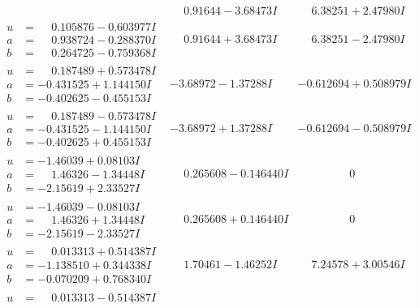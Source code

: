 \documentclass[1p]{elsarticle_modified}
\theoremstyle{definition}
\begin{document}
$$\begin{array}{c|c|c}
 & \phantom{-}0.91644 - 3.68473 I & \phantom{-}6.38251 + 2.47980 I \\ \hline\begin{aligned}
u &= \phantom{-}0.105876 - 0.603977 I \\
a &= \phantom{-}0.938724 - 0.288370 I \\
b &= \phantom{-}0.264725 - 0.759368 I\end{aligned}
 & \phantom{-}0.91644 + 3.68473 I & \phantom{-}6.38251 - 2.47980 I \\ \hline\begin{aligned}
u &= \phantom{-}0.187489 + 0.573478 I \\
a &= -0.431525 + 1.144150 I \\
b &= -0.402625 - 0.455153 I\end{aligned}
 & -3.68972 - 1.37288 I & -0.612694 + 0.508979 I \\ \hline\begin{aligned}
u &= \phantom{-}0.187489 - 0.573478 I \\
a &= -0.431525 - 1.144150 I \\
b &= -0.402625 + 0.455153 I\end{aligned}
 & -3.68972 + 1.37288 I & -0.612694 - 0.508979 I \\ \hline\begin{aligned}
u &= -1.46039 + 0.08103 I \\
a &= \phantom{-}1.46326 - 1.34448 I \\
b &= -2.15619 + 2.33527 I\end{aligned}
 & \phantom{-}0.265608 - 0.146440 I & \phantom{-0.000000 } 0 \\ \hline\begin{aligned}
u &= -1.46039 - 0.08103 I \\
a &= \phantom{-}1.46326 + 1.34448 I \\
b &= -2.15619 - 2.33527 I\end{aligned}
 & \phantom{-}0.265608 + 0.146440 I & \phantom{-0.000000 } 0 \\ \hline\begin{aligned}
u &= \phantom{-}0.013313 + 0.514387 I \\
a &= -1.138510 + 0.344338 I \\
b &= -0.070209 + 0.768340 I\end{aligned}
 & \phantom{-}1.70461 - 1.46252 I & \phantom{-}7.24578 + 3.00546 I \\ \hline\begin{aligned}
u &= \phantom{-}0.013313 - 0.514387 I \\

\end{aligned}
\end{array}$$
\end{document}
